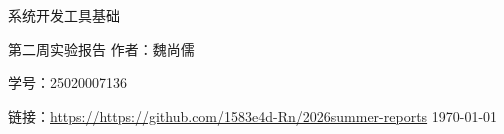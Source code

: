 \documentclass[12pt, a4paper]{article}
\newcommand{\myname}{魏尚儒}
\newcommand{\myid}{25020007136}
\newcommand{\mygithub}{https://https://github.com/1583e4d-Rn/2026summer-reports}
\begin{document}
\begin{titlepage}
    \centering
    \thispagestyle{empty}
    {\Huge 系统开发工具基础}
    \par
    \vspace{1em}
    {\Large 第二周实验报告}
    \vfill
    {\large 作者：\myname}
    \par
    {\large 学号：\myid}
    \par
    {\large 链接：\url{\mygithub}}
    {\large \today}

\end{titlepage}


\tableofcontents
\thispagestyle{empty}
\newpage




\end{document}
